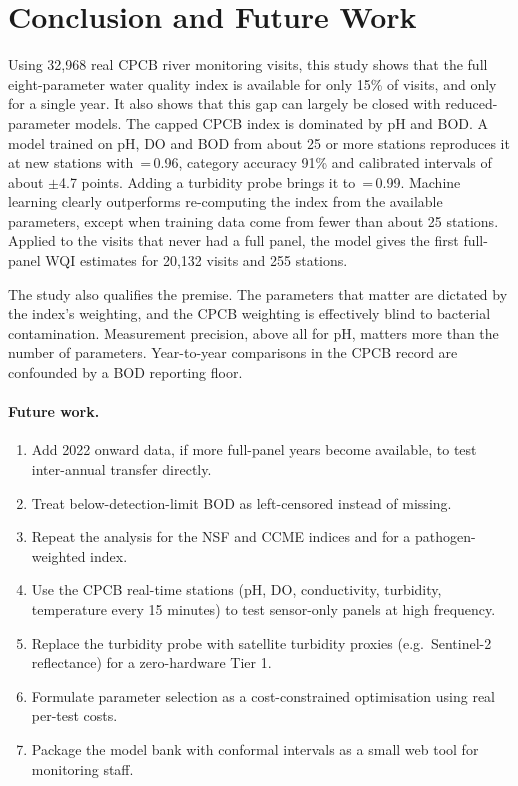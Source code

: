 \section{Conclusion and Future Work}
\label{sec:conclusion}

Using 32,968 real CPCB river monitoring visits, this study shows that the full eight-parameter water quality index is available for only 15\% of visits, and only for a single year. It also shows that this gap can largely be closed with reduced-parameter models. The capped CPCB index is dominated by pH and BOD. A model trained on pH, DO and BOD from about 25 or more stations reproduces it at new stations with \R{}\,=\,0.96, category accuracy 91\% and calibrated intervals of about $\pm$4.7 points. Adding a turbidity probe brings it to \R{}\,=\,0.99. Machine learning clearly outperforms re-computing the index from the available parameters, except when training data come from fewer than about 25 stations. Applied to the visits that never had a full panel, the model gives the first full-panel WQI estimates for 20,132 visits and 255 stations.

The study also qualifies the premise. The parameters that matter are dictated by the index's weighting, and the CPCB weighting is effectively blind to bacterial contamination. Measurement precision, above all for pH, matters more than the number of parameters. Year-to-year comparisons in the CPCB record are confounded by a BOD reporting floor.

\paragraph{Future work.}
\begin{enumerate}
  \item Add 2022 onward data, if more full-panel years become available, to test inter-annual transfer directly.
  \item Treat below-detection-limit BOD as left-censored instead of missing.
  \item Repeat the analysis for the NSF and CCME indices and for a pathogen-weighted index.
  \item Use the CPCB real-time stations (pH, DO, conductivity, turbidity, temperature every 15 minutes) to test sensor-only panels at high frequency.
  \item Replace the turbidity probe with satellite turbidity proxies (e.g.\ Sentinel-2 reflectance) for a zero-hardware Tier 1.
  \item Formulate parameter selection as a cost-constrained optimisation using real per-test costs.
  \item Package the model bank with conformal intervals as a small web tool for monitoring staff.
\end{enumerate}
